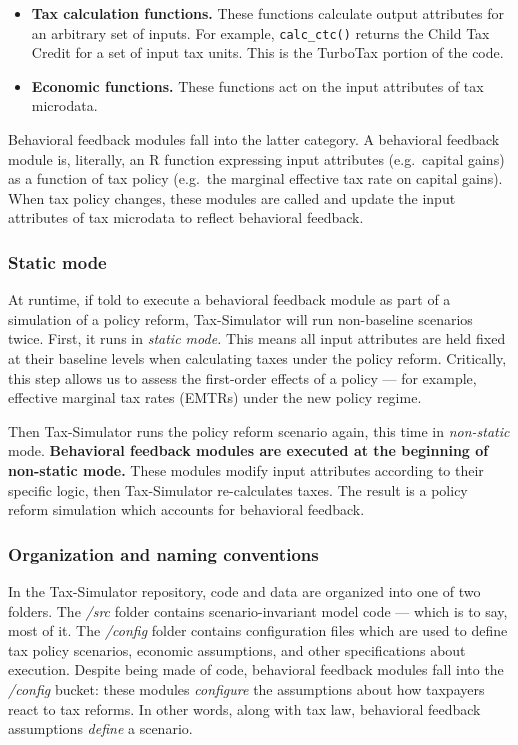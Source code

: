 \documentclass[
]{article}
\begin{document}
\begin{itemize}
\item
  \textbf{Tax calculation functions.} These functions calculate output
  attributes for an arbitrary set of inputs. For example,
  \texttt{calc\_ctc()} returns the Child Tax Credit for a set of input
  tax units. This is the TurboTax portion of the code.
\item
  \textbf{Economic functions.} These functions act on the input
  attributes of tax microdata.
\end{itemize}

Behavioral feedback modules fall into the latter category. A behavioral
feedback module is, literally, an R function expressing input attributes
(e.g.~capital gains) as a function of tax policy (e.g.~the marginal
effective tax rate on capital gains). When tax policy changes, these
modules are called and update the input attributes of tax microdata to
reflect behavioral feedback.

\hypertarget{static-mode}{%
\subsubsection{Static mode}\label{static-mode}}

At runtime, if told to execute a behavioral feedback module as part of a
simulation of a policy reform, Tax-Simulator will run non-baseline
scenarios twice. First, it runs in \emph{static mode.} This means all
input attributes are held fixed at their baseline levels when
calculating taxes under the policy reform. Critically, this step allows
us to assess the first-order effects of a policy --- for example,
effective marginal tax rates (EMTRs) under the new policy regime.

Then Tax-Simulator runs the policy reform scenario again, this time in
\emph{non-static} mode. \textbf{Behavioral feedback modules are executed
at the beginning of non-static mode.} These modules modify input
attributes according to their specific logic, then Tax-Simulator
re-calculates taxes. The result is a policy reform simulation which
accounts for behavioral feedback.

\hypertarget{organization-and-naming-conventions}{%
\subsubsection{Organization and naming
conventions}\label{organization-and-naming-conventions}}

In the Tax-Simulator repository, code and data are organized into one of
two folders. The \emph{/src} folder contains scenario-invariant model
code --- which is to say, most of it. The \emph{/config} folder contains
configuration files which are used to define tax policy scenarios,
economic assumptions, and other specifications about execution. Despite
being made of code, behavioral feedback modules fall into the
\emph{/config} bucket: these modules \emph{configure} the assumptions
about how taxpayers react to tax reforms. In other words, along with tax
law, behavioral feedback assumptions \emph{define} a scenario.
\end{document}
